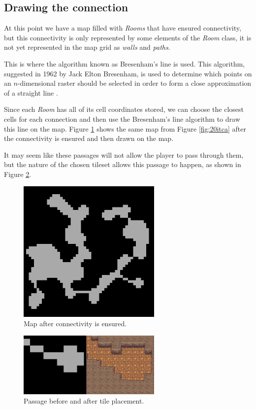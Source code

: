 \subsection{Drawing the connection}

At this point we have a map filled with \emph{Rooms} that have ensured connectivity, but this connectivity is only represented by some elements of the \emph{Room} class, it is not yet represented in the map grid as \emph{walls} and \emph{paths}.

This is where the algorithm known as Bresenham's line is used. This algorithm, suggested in 1962 by Jack Elton Bresenham, is used to determine which points on an \(n\)-dimensional raster should be selected in order to form a close approximation of a straight line \cite{bresenham:1965}. 

Since each \emph{Room} has all of its cell coordinates stored, we can choose the closest cells for each connection and then use the Bresenham's line algorithm to draw this line on the map. Figure \ref{fig:map_connected} shows the same map from Figure \ref{fig:20itca} after the connectivity is ensured and then drawn on the map.

It may seem like these passages will not allow the player to pass through them, but the nature of the chosen tileset allows this passage to happen, as shown in Figure \ref{fig:it_works}.

\begin{figure}[h]
    \caption{Map after connectivity is ensured.}
    \centerline{\includegraphics[width=7cm]{images/development/after_connection.png}}
    \label{fig:map_connected}
\end{figure}

\begin{figure}[h]
    \caption{Passage before and after tile placement.}
    \centerline{\includegraphics[width=7cm]{images/development/it_works.png}}
    \label{fig:it_works}
\end{figure}

